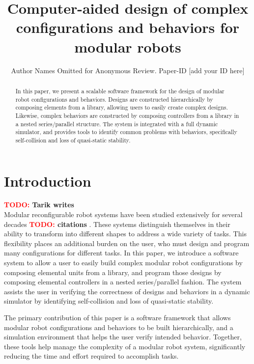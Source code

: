 \documentclass[conference]{IEEEtran}
\newcommand{\TODO}[1]{ {\bf \textcolor{red}{TODO:} #1 }}
\begin{document}
\title{Computer-aided design of complex configurations and behaviors for modular robots}

\author{Author Names Omitted for Anonymous Review. Paper-ID [add your ID here]}

\maketitle

\begin{abstract}
In this paper, we present a scalable software framework for the design of modular robot configurations and behaviors. Designs are constructed hierarchically by composing elements from a library, allowing users to easily create complex designs.  Likewise, complex behaviors are constructed by composing controllers from a library in a nested series/parallel structure. The system is integrated with a full dynamic simulator, and provides tools to identify common problems with behaviors, specifically self-collision and loss of quasi-static stability.

\end{abstract}

\section{Introduction}
\TODO{ Tarik writes} \\

Modular reconfigurable robot systems have been studied extensively for several decades \TODO{citations}.  These systems distinguish themselves in their ability to transform into different shapes to address a wide variety of tasks. This flexibility places an additional burden on the user, who must design and program many configurations for different tasks.  In this paper, we introduce a software system to allow a user to easily build complex modular robot configurations by composing elemental units from a library, and program those designs by composing elemental controllers in a nested series/parallel fashion.  The system assists the user in verifying the correctness of designs and behaviors in a dynamic simulator by identifying self-collision and loss of quasi-static stability.

The primary contribution of this paper is a software framework that allows modular robot configurations and behaviors to be built hierarchically, and a simulation environment that helps the user verify intended behavior.  Together, these tools help manage the complexity of a modular robot system, significantly reducing the time and effort required to accomplish tasks.
\end{document}
